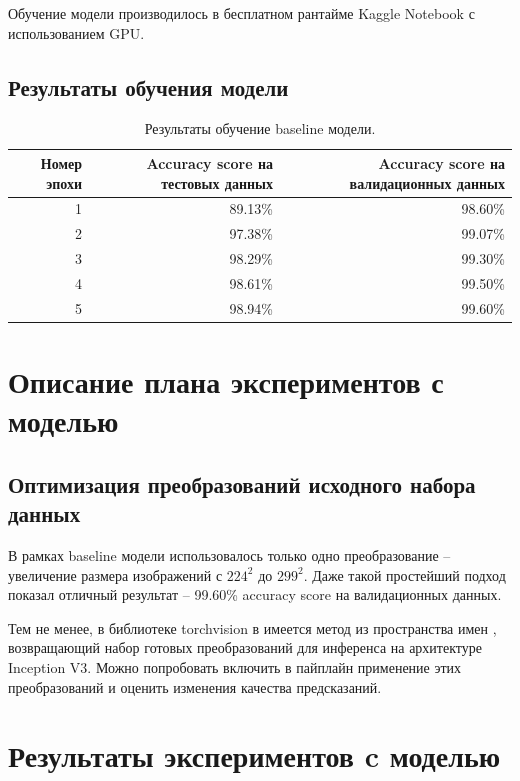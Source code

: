 \documentclass[a4paper,12pt]{extarticle}
\begin{document}
Обучение модели производилось в бесплатном рантайме Kaggle Notebook с использованием GPU.

\subsection{Результаты обучения модели}

\begin{table}[ht]
	\caption{Результаты обучение baseline модели.}
	\label{table:baseline_by_epoch}
	\footnotesize
	\centering
	\begin{tabular}{ |r|r|r| }
		\hline
		Номер эпохи & Accuracy score на тестовых данных & Accuracy score на валидационных данных \\ [0.5ex]
		\hline\hline
		1 & 89.13\% & 98.60\% \\
		\hline
		2 & 97.38\% & 99.07\% \\
		\hline
		3 & 98.29\% & 99.30\% \\
		\hline
		4 & 98.61\% & 99.50\% \\
		\hline
		5 & 98.94\% & 99.60\% \\
		\hline
	\end{tabular}
\end{table}

\newpage
\section{Описание плана экспериментов с моделью}

\subsection{Оптимизация преобразований исходного набора данных}

В рамках baseline модели использовалось только одно преобразование – увеличение размера изображений
с $224^2$ до $299^2$. Даже такой простейший подход показал отличный результат – 99.60\% accuracy
score на валидационных данных.\par

Тем не менее, в библиотеке torchvision в имеется метод  из
пространства имен ,
возвращающий набор готовых преобразований для инференса на архитектуре Inception V3. Можно попробовать
включить в пайплайн применение этих преобразований и оценить изменения качества предсказаний.

\newpage
\section{Результаты экспериментов c моделью}
\end{document}
